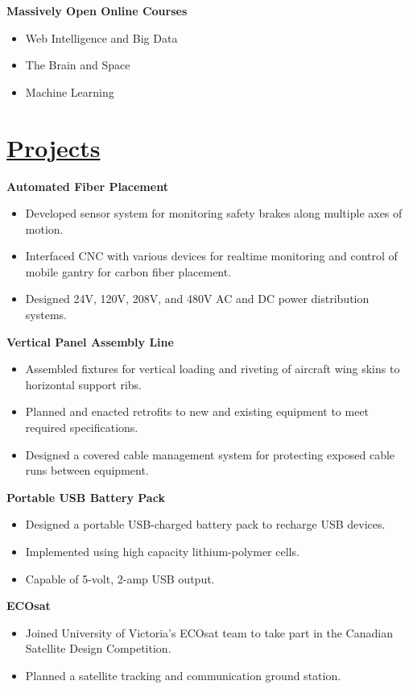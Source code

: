 \documentclass[a4paper, 11pt]{article}
\begin{document}
  \textbf{Massively Open Online Courses}
  \begin{itemize}[nosep]
    \item Web Intelligence and Big Data
    \item The Brain and Space
    \item Machine Learning
  \end{itemize}
  
\section{\underline{Projects}}
  \textbf{Automated Fiber Placement}
  \begin{itemize}[nosep]
    \item Developed sensor system for monitoring safety brakes along multiple axes of motion.
    \item Interfaced CNC with various devices for realtime monitoring and control of mobile gantry for carbon fiber placement.
    \item Designed 24V, 120V, 208V, and 480V AC and DC power distribution systems.
  \end{itemize}
  \medskip

  \textbf{Vertical Panel Assembly Line}
  \begin{itemize}[nosep]
    \item Assembled fixtures for vertical loading and riveting of aircraft wing skins to horizontal support ribs.
    \item Planned and enacted retrofits to new and existing equipment to meet required specifications.
    \item Designed a covered cable management system for protecting exposed cable runs between equipment.
  \end{itemize}
  \medskip

  \textbf{Portable USB Battery Pack}
  \begin{itemize}[nosep]
    \item Designed a portable USB-charged battery pack to recharge USB devices.
    \item Implemented using high capacity lithium-polymer cells.
    \item Capable of 5-volt, 2-amp USB output.
  \end{itemize}
  \medskip
  
  \textbf{ECOsat}
  \begin{itemize}[nosep]
    \item Joined University of Victoria's ECOsat team to take part in the Canadian Satellite Design Competition.
    \item Planned a satellite tracking and communication ground station.
  \end{itemize}
  
\end{document}
